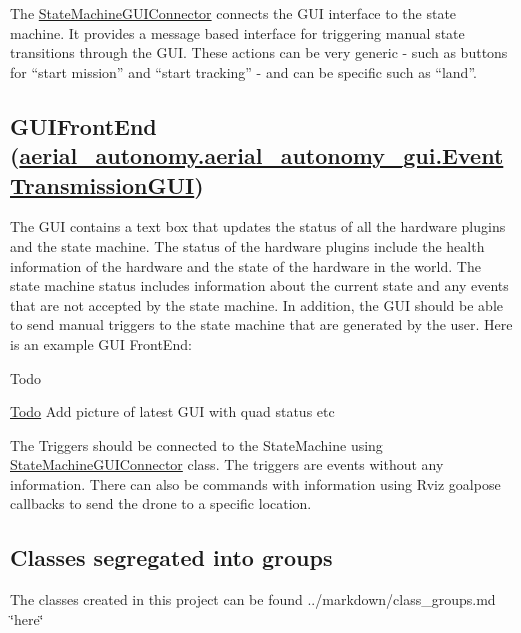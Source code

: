 The \hyperlink{classStateMachineGUIConnector}{State\-Machine\-G\-U\-I\-Connector} connects the G\-U\-I interface to the state machine. It provides a message based interface for triggering manual state transitions through the G\-U\-I. These actions can be very generic -\/ such as buttons for “start mission” and “start tracking” -\/ and can be specific such as “land”.

\subsection*{G\-U\-I\-Front\-End (\hyperlink{classaerial__autonomy_1_1aerial__autonomy__gui_1_1EventTransmissionGUI}{aerial\-\_\-autonomy.\-aerial\-\_\-autonomy\-\_\-gui.\-Event\-Transmission\-G\-U\-I})}

The G\-U\-I contains a text box that updates the status of all the hardware plugins and the state machine. The status of the hardware plugins include the health information of the hardware and the state of the hardware in the world. The state machine status includes information about the current state and any events that are not accepted by the state machine. In addition, the G\-U\-I should be able to send manual triggers to the state machine that are generated by the user. Here is an example G\-U\-I Front\-End\-:

\begin{DoxyRefDesc}{Todo}
\item[\hyperlink{todo__todo000014}{Todo}]Add picture of latest G\-U\-I with quad status etc\end{DoxyRefDesc}


The Triggers should be connected to the {\ttfamily State\-Machine} using {\ttfamily \hyperlink{classStateMachineGUIConnector}{State\-Machine\-G\-U\-I\-Connector}} class. The triggers are events without any information. There can also be commands with information using {\ttfamily Rviz} goalpose callbacks to send the drone to a specific location.

\subsection*{Classes segregated into groups}

The classes created in this project can be found ../markdown/class\-\_\-groups.md \char`\"{}here\char`\"{} 